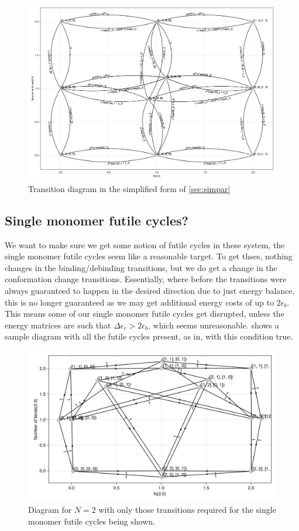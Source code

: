 \documentclass[11pt]{article}
\begin{document}
\begin{figure}[H]
	\includegraphics[width=\textwidth]{../../plots/simple_sg_B=1_C=2_N=2_version=2.5.png}
	\caption{
		Transition diagram in the simplified form of \cref{sec:simpar}
	}\label{fig:N2trans}
\end{figure}

\subsection{Single monomer futile cycles?}
We want to make sure we get some notion of futile cycles in these system, the single monomer futile cycles seem like a reasonable target.
To get thses, nothing changes in the binding/debinding transitions, but we do get a change in the conformation change transitions.
Essentially, where before the transitions were always guaranteed to happen in the desired direction due to just energy balance, this is no longer guaranteed as we may get additional energy costs of up to $2\epsilon_b$.
This means some of our single monomer futile cycles get disrupted, unless the energy matrices are such that $\Delta\epsilon_r > 2\epsilon_b$, which seems unreasonable.
 shows a sample diagram with all the futile cycles present, as in, with this condition true.

\begin{figure}[H]
	\includegraphics[width=\textwidth]{../../plots/fcs_B=1_C=2_N=2_version=2.5.png}
	\caption{
		Diagram for $N=2$ with only those transitions required for the single monomer futile cycles being shown.
	}\label{fig:N2fcs}
\end{figure}
\end{document}
